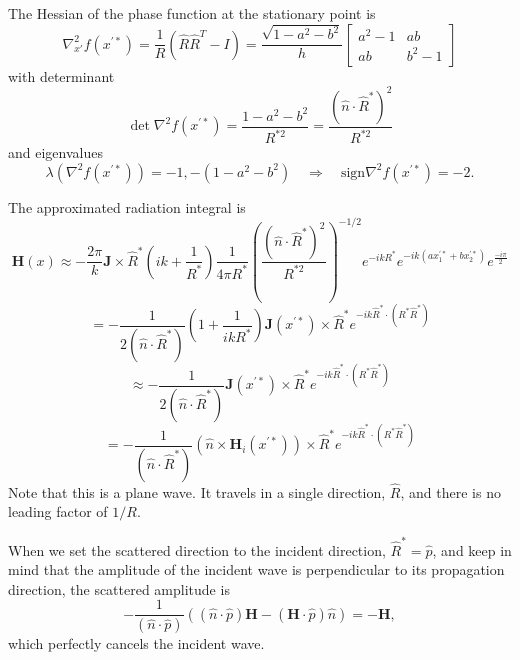 \documentclass{article}
\theoremstyle{plain}
\begin{document}
The Hessian of the phase function at the stationary point is
\begin{equation}
	\nabla^2_{x'} f(x^{'*}) =
	\frac{1}{R}\left( \hat{R}\hat{R}^T - I \right) =
	\frac{\sqrt{1-a^2-b^2}}{h}
	\begin{bmatrix}
		a^2-1 & ab \\
		ab & b^2-1
	\end{bmatrix}
\end{equation}
with determinant
\begin{equation}
	\det \nabla^2 f(x^{'*})
	= \frac{1-a^2-b^2}{R^{*2}}
	= \frac{\left(\hat{n}\cdot\hat{R}^*\right)^2}{R^{*2}}
\end{equation}
and eigenvalues
\begin{equation}
	\lambda\left( \nabla^2 f(x^{'*}) \right) = 
	-1, -\left( 1-a^2-b^2 \right)
	\quad\Rightarrow\quad \text{sign}\nabla^2 f(x^{'*}) = -2.
\end{equation}


The approximated radiation integral is
\begin{equation}
	\mathbf{H}(x) \approx
	-\frac{2\pi}{k}
	\mathbf{J} \times \hat{R}^*
	\left( ik + \frac{1}{R^*} \right)
	\frac{1}{4\pi R^*}
	\left( \frac{\left(\hat{n}\cdot\hat{R}^*\right)^2}{R^{*2}} \right)^{-1/2}
	e^{-ikR^*}
	e^{-ik(ax_1^{'*} + bx_2^{'*})}
	e^{\frac{-i\pi}{2}}
\end{equation}
\begin{equation}
	=
	-\frac{1}{2\left(\hat{n}\cdot\hat{R}^*\right)}
	\left( 1 + \frac{1}{ikR^*} \right)
	\mathbf{J}(x^{'*}) \times \hat{R}^*
	e^{-ik\hat{R}^*\cdot (R^*\hat{R}^*)}
\end{equation}
\begin{equation}
	\approx
	-\frac{1}{2\left(\hat{n}\cdot\hat{R}^*\right)}
	\mathbf{J}(x^{'*}) \times \hat{R}^*
	e^{-ik\hat{R}^*\cdot (R^*\hat{R}^*)}
\end{equation}
\begin{equation}
	=
	-\frac{1}{\left(\hat{n}\cdot\hat{R}^*\right)}
	\left( \hat{n} \times \mathbf{H}_i(x^{'*}) \right) \times \hat{R}^*
	e^{-ik\hat{R}^*\cdot (R^*\hat{R}^*)}
\end{equation}
Note that this is a plane wave.
It travels in a single direction, $\hat{R}$, and
there is no leading factor of $1/R$.

When we set the scattered direction to the incident direction, $\hat{R}^*=\hat{p}$,
and keep in mind that the amplitude of the incident wave is perpendicular to its propagation direction,
the scattered amplitude is
\begin{equation}
	-\frac{1}{\left(\hat{n}\cdot\hat{p}\right)}
	\left( \left(\hat{n}\cdot\hat{p}\right)\mathbf{H} - \left(\mathbf{H}\cdot\hat{p}\right)\hat{n} \right)
	=-\mathbf{H},
\end{equation}
which perfectly cancels the incident wave.
\end{document}
